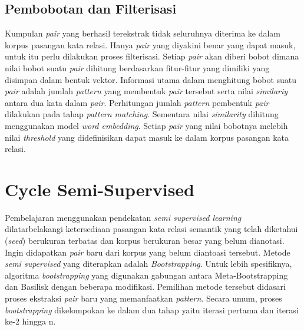 \subsection{Pembobotan dan Filterisasi}
Kumpulan \textit{pair} yang berhasil terekstrak tidak seluruhnya diterima ke dalam korpus pasangan kata relasi. Hanya \textit{pair} yang diyakini benar yang dapat masuk, untuk itu perlu dilakukan proses filterisasi. Setiap \textit{pair} akan diberi bobot dimana nilai bobot suatu \textit{pair} dihitung berdasarkan fitur-fitur yang dimiliki yang disimpan dalam bentuk vektor. Informasi utama dalam menghitung bobot suatu \textit{pair} adalah jumlah \textit{pattern} yang membentuk \textit{pair} tersebut serta nilai \textit{similariy} antara dua kata dalam \textit{pair}. Perhitungan jumlah \textit{pattern} pembentuk \textit{pair} dilakukan pada tahap \textit{pattern matching}. Sementara nilai \textit{similarity} dihitung menggunakan model \textit{word embedding}. Setiap \textit{pair} yang nilai bobotnya melebih nilai \textit{threshold} yang didefinisikan dapat masuk ke dalam korpus pasangan kata relasi.


\section{Cycle Semi-Supervised}
Pembelajaran menggunakan pendekatan \textit{semi supervised learning} dilatarbelakangi ketersediaan pasangan kata relasi semantik yang telah diketahui (\textit{seed}) berukuran terbatas dan korpus berukuran besar yang belum dianotasi. Ingin didapatkan \textit{pair} baru dari korpus yang belum diantoasi tersebut. Metode \textit{semi supervised} yang diterapkan adalah \textit{Bootstrapping}. Untuk lebih spesifiknya, algoritma \textit{bootstrapping} yang digunakan gabungan antara Meta-Bootstrapping dan Basilisk dengan beberapa modifikasi. Pemilihan metode tersebut didasari proses ekstraksi \textit{pair} baru yang memanfaatkan \textit{pattern}. Secara umum, proses \textit{bootstrapping} dikelompokan ke dalam dua tahap yaitu iterasi pertama dan iterasi ke-2 hingga n.

